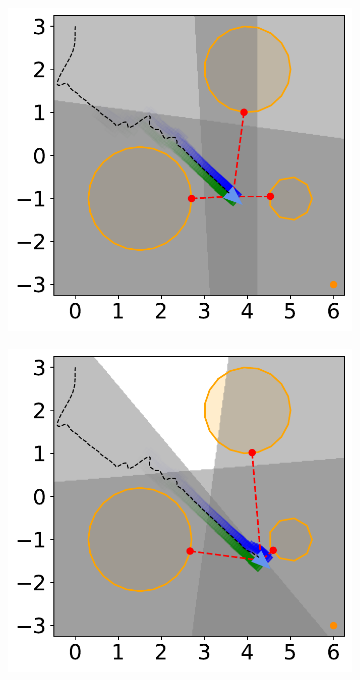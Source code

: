 \begin{figure}[H]
    \begin{subfigure}{0.35\textwidth}
        \centering
        \includegraphics[width=\textwidth]{figures/Simulations/sim1circles_delta/frame_6.pdf}
    \end{subfigure}%
    \hspace{1em}
    \begin{subfigure}{0.35\textwidth}
        \centering
        \includegraphics[width=\textwidth]{figures/Simulations/sim1circles_delta/frame_7.pdf}
    \end{subfigure}%


\end{figure}

